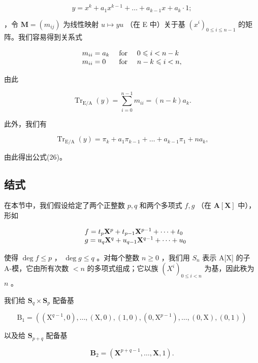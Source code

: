 \[
y = x ^ {k} + a _ {1} x ^ {k - 1} + \dots + a _ {k - 1} x + a _ {k} \cdot 1;
\]

，令 \(\mathbf{M} = (m_{ij})\) 为线性映射 \(u\mapsto yu\) （在 E 中）关于基 \((x^{i})_{0\leqslant i\leqslant n-1}\) 的矩阵。我们容易得到关系式

\[
\begin{array}{l l} m _ {i i} = a _ {k} & \text { for } \quad 0 \leqslant i <   n - k \\ m _ {i i} = 0 & \text { for } \quad n - k \leqslant i <   n, \end{array}
\]

由此

\[
\operatorname{Tr} _ {\mathrm{E/A}} (y) = \sum_ {i = 0} ^ {n - 1} m _ {i i} = (n - k) a _ {k}.
\]

此外，我们有

\[
\operatorname{Tr} _ {\mathrm{E/A}} (y) = \pi_ {k} + a _ {1} \pi_ {k - 1} + \dots + a _ {k - 1} \pi_ {1} + n a _ {k},
\]

由此得出公式(26)。

\subsection{结式}

在本节中，我们假设给定了两个正整数 \(p, q\) 和两个多项式 \(f, g\) （在 \(\mathbf{A}[\mathbf{X}]\) 中），形如

\[
\begin{array}{r l} & {f = t _ {p} \mathbf {X} ^ {p} + t _ {p - 1} \mathbf {X} ^ {p - 1} + \dots + t _ {0}} \\ & {g = u _ {q} \mathbf {X} ^ {q} + u _ {q - 1} \mathbf {X} ^ {q - 1} + \dots + u _ {0}} \end{array}
\]

使得 \(\deg f \leqslant p\) ， \(\deg g \leqslant q\) 。对每个整数 \(n \geqslant 0\) ，我们用 \(S_n\) 表示 A{[}X{]} 的子 A-模，它由所有次数 \(< n\) 的多项式组成；它以族 \((X^i)_{0 \leqslant i < n}\) 为基，因此秩为 \(n\) 。

我们给 \(\mathbf{S}_q\times \mathbf{S}_p\) 配备基

\[
\mathrm{B} _ {1} = \left(\left(\mathrm{X} ^ {q - 1}, 0\right), \dots , (\mathrm{X}, 0), (1, 0), \left(0, \mathrm{X} ^ {p - 1}\right), \dots , (0, \mathrm{X}), (0, 1)\right)
\]

以及给 \(\mathbf{S}_{p + q}\) 配备基

\[
\mathbf {B} _ {2} = \left(\mathbf {X} ^ {p + q - 1}, \dots , \mathbf {X}, 1\right).
\]

